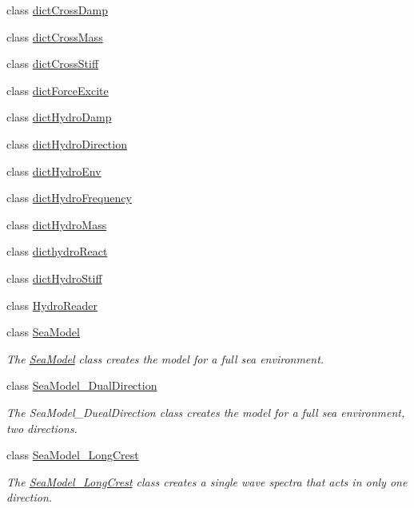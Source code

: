 \begin{DoxyCompactItemize}
class \hyperlink{classosea_1_1dict_cross_damp}{dict\-Cross\-Damp}
\item 
class \hyperlink{classosea_1_1dict_cross_mass}{dict\-Cross\-Mass}
\item 
class \hyperlink{classosea_1_1dict_cross_stiff}{dict\-Cross\-Stiff}
\item 
class \hyperlink{classosea_1_1dict_force_excite}{dict\-Force\-Excite}
\item 
class \hyperlink{classosea_1_1dict_hydro_damp}{dict\-Hydro\-Damp}
\item 
class \hyperlink{classosea_1_1dict_hydro_direction}{dict\-Hydro\-Direction}
\item 
class \hyperlink{classosea_1_1dict_hydro_env}{dict\-Hydro\-Env}
\item 
class \hyperlink{classosea_1_1dict_hydro_frequency}{dict\-Hydro\-Frequency}
\item 
class \hyperlink{classosea_1_1dict_hydro_mass}{dict\-Hydro\-Mass}
\item 
class \hyperlink{classosea_1_1dicthydro_react}{dicthydro\-React}
\item 
class \hyperlink{classosea_1_1dict_hydro_stiff}{dict\-Hydro\-Stiff}
\item 
class \hyperlink{classosea_1_1_hydro_reader}{Hydro\-Reader}
\item 
class \hyperlink{classosea_1_1_sea_model}{Sea\-Model}
\begin{DoxyCompactList}\small\item\em The \hyperlink{classosea_1_1_sea_model}{Sea\-Model} class creates the model for a full sea environment. \end{DoxyCompactList}\item 
class \hyperlink{classosea_1_1_sea_model___dual_direction}{Sea\-Model\-\_\-\-Dual\-Direction}
\begin{DoxyCompactList}\small\item\em The Sea\-Model\-\_\-\-Dueal\-Direction class creates the model for a full sea environment, two directions. \end{DoxyCompactList}\item 
class \hyperlink{classosea_1_1_sea_model___long_crest}{Sea\-Model\-\_\-\-Long\-Crest}
\begin{DoxyCompactList}\small\item\em The \hyperlink{classosea_1_1_sea_model___long_crest}{Sea\-Model\-\_\-\-Long\-Crest} class creates a single wave spectra that acts in only one direction. \end{DoxyCompactList}\item 

\end{DoxyCompactItemize}
